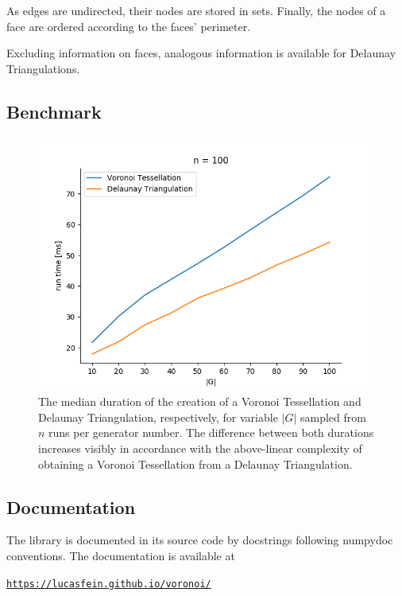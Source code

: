 \documentclass[a4paper]{article}
\begin{document}
As edges are undirected, their nodes are stored in sets. Finally, the nodes of a face are ordered according to the faces'
perimeter.

Excluding information on faces, analogous information is available for Delaunay Triangulations.

\subsection{Benchmark}
\begin{figure}[H]
	\includegraphics[width=\textwidth]{benchmark.png}
	\caption{The median duration of the creation of a Voronoi Tessellation and Delaunay Triangulation, respectively,
		for variable \(|G|\) sampled from \(n\) runs per generator number.
		The difference between both durations increases visibly in accordance with the above-linear complexity of obtaining
		a Voronoi Tessellation from a Delaunay Triangulation.}
\end{figure}

\subsection{Documentation}
The library is documented in its source code by docstrings following numpydoc conventions. 
The documentation is available at 	

\begin{center}
	\href{https://lucasfein.github.io/voronoi/}{\texttt{https://lucasfein.github.io/voronoi/}}
\end{center}

\printbibliography
\end{document}
